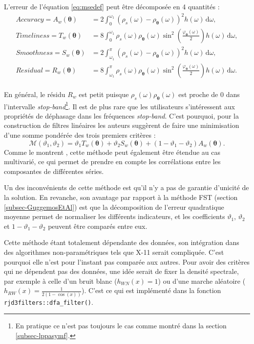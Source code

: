 \documentclass[
  12pt,
  a4paper,french]{article}
\newcommand\1{\mathds{1}}
\newcommand\ud{\,\mathrm{d}}
\begin{document}
L'erreur de l'équation \eqref{eq:msedef} peut être décomposée en 4 quantités :
\begin{align*}
Accuracy =A_w(\boldsymbol\theta)&= 2\int_0^{\omega_1}\left(\rho_s(\omega)-\rho_{\boldsymbol\theta}(\omega)\right)^{2}h(\omega)\ud\omega,\\
Timeliness =T_w(\boldsymbol\theta)&= 8\int_0^{\omega_1}\rho_s(\omega)\rho_{\boldsymbol\theta}(\omega)\sin^{2}\left(\frac{\varphi_{\boldsymbol\theta}(\omega)}{2}\right)h(\omega)\ud\omega,\\
Smoothness =S_w(\boldsymbol\theta)&= 2\int_{\omega_1}^\pi\left(\rho_s(\omega)-\rho_{\boldsymbol\theta}(\omega)\right)^{2}h(\omega)\ud\omega,\\
Residual =R_w(\boldsymbol\theta)&= 8\int_{\omega_1}^\pi\rho_s(\omega)\rho_{\boldsymbol\theta}(\omega)\sin^{2}\left(\frac{\varphi_{\boldsymbol\theta}(\omega)}{2}\right)h(\omega)\ud\omega.\\
\end{align*}

En général, le résidu \(R_w\) est petit puisque \(\rho_s(\omega)\rho_{\boldsymbol\theta}(\omega)\) est proche de 0 dans l'intervalle \emph{stop-band}\footnote{
  En pratique ce n'est pas toujours le cas comme montré dans la section \ref{subsec-lppasymf}.}.
Il est de plus rare que les utilisateurs s'intéressent aux propriétés de déphasage dans les fréquences \emph{stop-band}.
C'est pourquoi, pour la construction de filtres linéaires les auteurs suggèrent de faire une minimisation d'une somme pondérée des trois premiers critères :
\[
\mathcal{M}(\vartheta_{1},\vartheta_{2})=\vartheta_{1}T_w(\boldsymbol\theta)+\vartheta_{2}S_w(\boldsymbol\theta)+(1-\vartheta_{1}-\vartheta_{2})A_w(\boldsymbol\theta).
\]
Comme le montrent \textcite{tuckerwildi2020}, cette méthode peut également être étendue au cas multivarié, ce qui permet de prendre en compte les corrélations entre les composantes de différentes séries.

Un des inconvénients de cette méthode est qu'il n'y a pas de garantie d'unicité de la solution.
En revanche, son avantage par rapport à la méthode FST (section \ref{subsec-GuggemosEtAl}) est que la décomposition de l'erreur quadratique moyenne permet de normaliser les différents indicateurs, et les coefficients \(\vartheta_{1}\), \(\vartheta_{2}\) et \(1-\vartheta_{1}-\vartheta_{2}\) peuvent être comparés entre eux.

Cette méthode étant totalement dépendante des données, son intégration dans des algorithmes non-paramétriques tels que X-11 serait compliquée.
C'est pourquoi elle n'est pour l'instant pas comparée aux autres.
Pour avoir des critères qui ne dépendent pas des données, une idée serait de fixer la densité spectrale, par exemple à celle d'un bruit blanc (\(h_{WN}(x)=1\)) ou d'une marche aléatoire (\(h_{RW}(x)=\frac{1}{2(1-\cos(x))}\)).
C'est ce qui est implémenté dans la fonction \texttt{rjd3filters::dfa\_filter()}.
\end{document}
